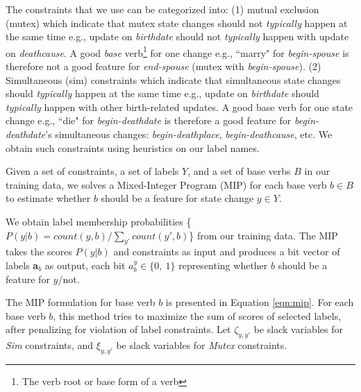 The constraints that we use can be categorized into: (1) mutual exclusion (mutex) which indicate that mutex state changes should not \textit{typically} happen at the same time e.g., update on \textit{birthdate} should not \textit{typically} happen with update on \textit{deathcause}. %
A good \textit{base} verb\footnote[3]{The verb root or base form of a verb} for one change e.g., ``marry" for \textit{begin-spouse} is therefore not a good feature for \textit{end-spouse} (mutex with \textit{begin-spouse}). (2) Simultaneous (sim) constraints which indicate that simultaneous state changes should \textit{typically} happen at the same time e.g., update on \textit{birthdate} should \textit{typically} happen with other birth-related updates. %
A good base verb for one state change e.g., ``die" for \textit{begin-deathdate} is therefore a good feature for \textit{begin-deathdate}'s simultaneous changes: \textit{begin-deathplace}, \textit{begin-deathcause}, etc. We obtain such constraints using heuristics on our label names.%

Given a set of constraints, a set of labels $Y$, and a set of base verbs $B$ in our training data, we solves a Mixed-Integer Program (MIP) for each base verb $b \in B$ to estimate whether $b$ should be a feature for state change $y \in Y$. 

We obtain label membership probabilities \{$P(y | b) = count(y, b) / \sum_{y'} count(y', b) $\} from our training data. The MIP takes the scores $P(y | b)$ and constraints as input and produces a bit vector of labels \textbf{a}$_{b}$ as output, each bit  $a_{b}^{y} \in \{0,\ 1\}$ representing whether $b$ should be a feature for $y$/not.

The MIP formulation for base verb $b$ is presented in Equation \ref{eqn:mip}. For each base verb $b$, this method tries to maximize the sum of scores of selected labels, after penalizing for violation of label constraints. Let $\zeta_{y, y'}$ be slack variables for \textit{Sim} constraints, and $\xi_{y, y'}$ be slack variables for \textit{Mutex} constraints. 

